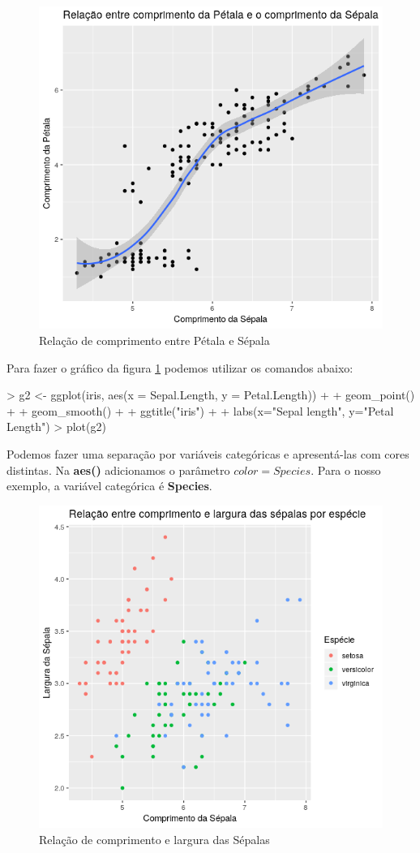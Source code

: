 \documentclass[12pt,a4paper,oneside]{erdc}
\begin{document}
\begin{figure}[htpb]
	\centering
	\includegraphics[width=0.7\linewidth]{../figs/BP_Curso_TecComp_00_2019_f06-05}
	\caption{Relação de comprimento entre Pétala e Sépala}
	\label{fig:f06-05}
\end{figure}

Para fazer o gráfico da figura \ref{fig:f06-05} podemos utilizar os comandos abaixo:

\begin{Schunk}
\begin{Sinput}
> g2 <- ggplot(iris, aes(x = Sepal.Length, y = Petal.Length)) + 
+ geom_point() +
+ geom_smooth() +
+ ggtitle("iris") +
+ labs(x="Sepal length", y="Petal Length")
> plot(g2)
\end{Sinput}
\end{Schunk}

Podemos fazer uma separação por variáveis categóricas e apresentá-las com cores distintas. Na \textbf{aes()} adicionamos o parâmetro $color = Species$. Para o nosso exemplo, a variável categórica é \textbf{Species}.

\begin{figure}[htpb!]
	\centering
	\includegraphics[width=0.7\linewidth]{../figs/BP_Curso_TecComp_00_2019_f06-06}
	\caption{Relação de comprimento e largura das Sépalas}
	\label{fig:f06-06}
\end{figure}
\end{document}

